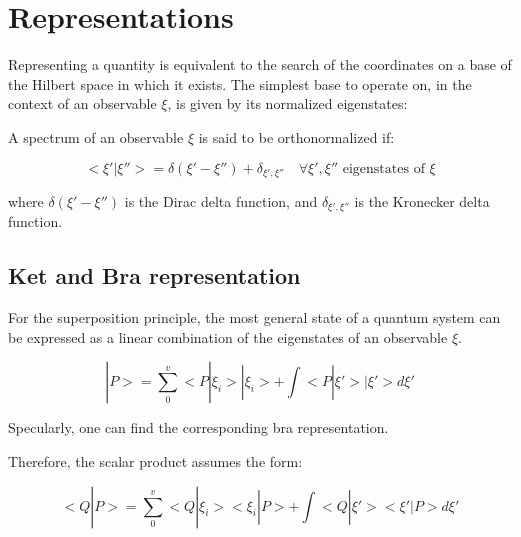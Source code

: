 \documentclass{article}
\begin{document}
\section{Representations}

Representing a quantity is equivalent to the search of the coordinates on a base of the Hilbert space in which it exists.
The simplest base to operate on, in the context of an observable $\xi$, is given by its normalized eigenstates:

\begin{tcolorbox}[colframe=gray!90, colback=blue!5, coltitle=white, title=\textbf{Definition: Orthonormalized Eigenstates}, fonttitle=\large\bfseries]

    A spectrum of an observable $\xi$ is said to be orthonormalized if:

    \begin{equation}
        <\xi'|\xi''> = \delta(\xi'-\xi'') + \delta_{\xi',\xi''} \quad \forall \xi',\xi'' \text{ eigenstates of $\xi$}
    \end{equation}

    where $\delta(\xi'-\xi'')$ is the Dirac delta function, and $\delta_{\xi',\xi''}$ is the Kronecker delta function.

\end{tcolorbox}

\subsection{Ket and Bra representation}

For the superposition principle, the most general state of a quantum system can be expressed as a linear combination of the eigenstates of an observable $\xi$.

\begin{tcolorbox}[colframe=gray!50, colback=gray!10, coltitle=black, title=Ket representation]
    \begin{equation}
        |P>= \sum_{0}^{v} <P|\xi_i>|\xi_i>+ \int <P|\xi'>|\xi'>d\xi'
    \end{equation}
\end{tcolorbox}

Specularly, one can find the corresponding bra representation.

Therefore, the scalar product assumes the form:

\begin{tcolorbox}[colframe=gray!50, colback=gray!10, coltitle=black, title=Scalar product]
    \begin{equation}
        <Q|P>= \sum_{0}^{v} <Q|\xi_i><\xi_i|P>+ \int <Q|\xi'><\xi'|P>d\xi'
    \end{equation}
\end{tcolorbox}
\end{document}
